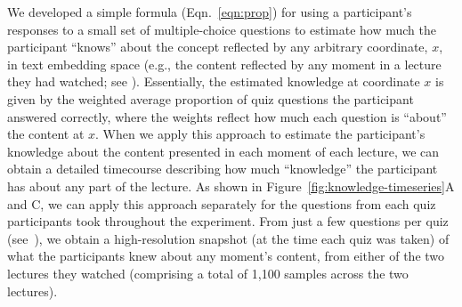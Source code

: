 \documentclass[10pt]{article}
\renewcommand{\nameref}[1]{\mbox{\textit{\oldnameref{#1}}}}
\begin{document}
We developed a simple formula (Eqn.~\ref{eqn:prop}) for using a participant's
responses to a small set of multiple-choice questions to estimate how much the
participant ``knows'' about the concept reflected by any arbitrary coordinate,
$x$, in text embedding space (e.g., the content reflected by any moment in a
lecture they had watched; see \nameref{subsec:traces}). Essentially, the
estimated knowledge at coordinate $x$ is given by the weighted average
proportion of quiz questions the participant answered correctly, where the
weights reflect how much each question is ``about'' the content at $x$. When we
apply this approach to estimate the participant's knowledge about the content
presented in each moment of each lecture, we can obtain a detailed timecourse
describing how much ``knowledge'' the participant has about any part of the
lecture. As shown in Figure~\ref{fig:knowledge-timeseries}A and C, we can apply
this approach separately for the questions from each quiz participants took
throughout the experiment. From just a few questions per quiz (see~\nameref{subsec:traces}), we obtain a
high-resolution snapshot (at the time each quiz was taken) of what the
participants knew about any moment's content, from either of the two lectures
they watched (comprising a total of 1,100 samples across the two lectures).
\end{document}
